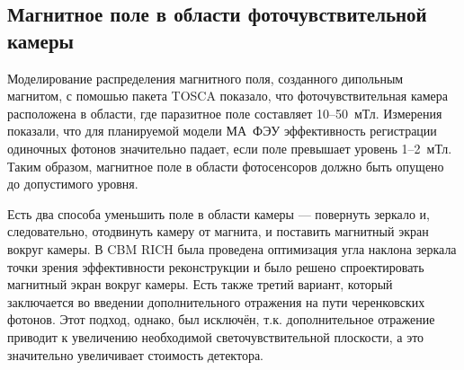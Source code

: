 \subsection{Магнитное поле в области фоточувствительной камеры}

Моделирование распределения магнитного поля, созданного дипольным магнитом, с помошью пакета TOSCA показало, что фоточувствительная камера расположена в области, где паразитное поле составляет 10--50~мТл. Измерения показали, что для планируемой модели МА~ФЭУ эффективность регистрации одиночных фотонов значительно падает, если поле превышает уровень 1--2~мТл. Таким образом, магнитное поле в области фотосенсоров должно быть опущено до допустимого уровня.


Есть два способа уменьшить поле в области камеры --- повернуть зеркало и, следовательно, отодвинуть камеру от магнита, и поставить магнитный экран вокруг камеры. В CBM RICH была проведена оптимизация угла наклона зеркала точки зрения эффективности реконструкции и было решено спроектировать магнитный экран вокруг камеры.
Есть также третий вариант, который заключается во введении дополнительного отражения на пути черенковских фотонов. Этот подход, однако, был исключён, т.к. дополнительное отражение приводит к увеличению необходимой светочувствительной плоскости, а это значительно увеличивает стоимость детектора.



